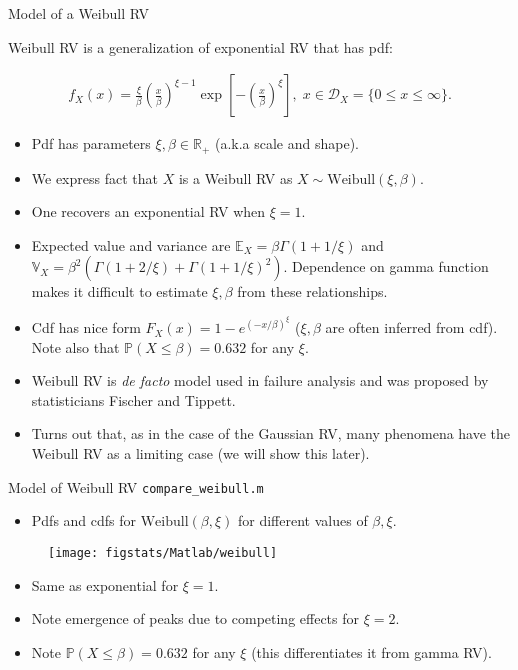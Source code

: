 \documentclass[handout,9pt]{beamer}
\begin{document}
%
\begin{frame}{Model of a Weibull RV}

Weibull RV is a generalization of exponential RV that has pdf:
\begin{block}{}
\begin{align*}
f_X(x)=\frac{\xi}{\beta}\left(\frac{x}{\beta}\right)^{\xi-1}\exp\left[{-\left(\frac{x}{\beta}\right)^\xi}\right],\; x\in \mathcal{D}_X=\{0\leq x\leq \infty\}.
\end{align*}
\end{block}
\begin{itemize}
\setlength{\itemsep}{5pt}
\item Pdf has parameters $\xi,\beta\in \mathbb{R}_+$ (a.k.a scale and shape).
\item We express fact that $X$ is a Weibull RV as $X\sim \textrm{Weibull}(\xi,\beta)$.
\item One recovers an exponential RV when $\xi=1$. 
\item Expected value and variance are $\mathbb{E}_X=\beta\Gamma(1+1/\xi)$ and $\mathbb{V}_X=\beta^2\left(\Gamma(1+2/\xi)+\Gamma(1+1/\xi)^2\right)$. Dependence on gamma function makes it difficult to estimate $\xi,\beta$ from these relationships. 
\item Cdf has nice form $F_X(x)=1-e^{(-x/\beta)^\xi}$ ($\xi,\beta$ are often inferred from cdf). Note also that $\mathbb{P}(X\leq \beta)=0.632$ for any $\xi$. 
\item Weibull RV is {\em de facto} model used in failure analysis and was proposed by statisticians Fischer and Tippett. 
\item Turns out that, as in the case of the Gaussian RV, many phenomena have the Weibull RV as a limiting case (we will show this later). 
\end{itemize}

\end{frame}

%
\begin{frame}{Model of Weibull RV \footnotesize{\texttt{compare\_weibull.m}}}
\begin{itemize}
\item Pdfs and cdfs for $\textrm{Weibull}(\beta,\xi)$ for different values of $\beta,\xi$.
\end{itemize}
\begin{figure}[!htb]
    \centering
	\texttt{[image: figstats/Matlab/weibull]}
\end{figure}
\begin{itemize}
\item Same as exponential for $\xi=1$.
\item Note emergence of peaks due to competing effects for $\xi=2$. 
\item Note $\mathbb{P}(X\leq \beta)=0.632$ for any $\xi$ (this differentiates it from gamma RV).
\end{itemize}
\end{frame}
\end{document}
